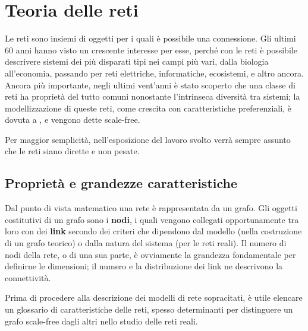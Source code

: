 \clearpage
\section{Teoria delle reti}
\label{sec:teoria}
Le reti sono insiemi di oggetti per i quali è possibile una connessione. Gli ultimi 60 anni hanno visto un crescente interesse per esse, perché con le reti è possibile descrivere sistemi dei più disparati tipi nei campi più vari, dalla biologia all'economia, passando per reti elettriche, informatiche, ecosistemi,  e altro ancora. Ancora più importante, negli ultimi vent'anni è stato scoperto che una classe di reti ha proprietà del tutto comuni nonostante l'intrinseca diversità tra sistemi; la modellizzazione di queste reti, come crescita con caratteristiche preferenziali, è dovuta a \textcite{Barbalbert1999}, e vengono dette scale-free.

Per maggior semplicità, nell'esposizione del lavoro svolto verrà sempre assunto che le reti siano dirette e non pesate.

\subsection{Proprietà e grandezze caratteristiche}
Dal punto di vista matematico una rete è rappresentata da un grafo. Gli oggetti costitutivi di un grafo sono i \textbf{nodi}, i quali vengono collegati opportunamente tra loro con dei \textbf{link} secondo dei criteri che dipendono dal modello (nella costruzione di un grafo teorico) o dalla natura del sistema (per le reti reali). Il numero di nodi della rete, o di una sua parte, è ovviamente la grandezza fondamentale per definirne le dimensioni; il numero e la distribuzione dei link ne descrivono la connettività.

Prima di procedere alla descrizione dei modelli di rete sopracitati, è utile elencare un glossario di caratteristiche delle reti, spesso determinanti per distinguere un grafo scale-free dagli altri nello studio delle reti reali.

